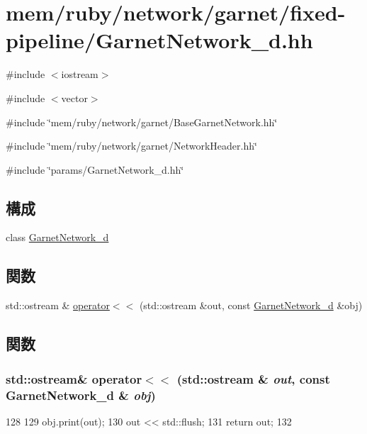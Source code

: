 \hypertarget{GarnetNetwork__d_8hh}{
\section{mem/ruby/network/garnet/fixed-\/pipeline/GarnetNetwork\_\-d.hh}
\label{GarnetNetwork__d_8hh}
}
{\ttfamily \#include $<$iostream$>$}\par
{\ttfamily \#include $<$vector$>$}\par
{\ttfamily \#include \char`\"{}mem/ruby/network/garnet/BaseGarnetNetwork.hh\char`\"{}}\par
{\ttfamily \#include \char`\"{}mem/ruby/network/garnet/NetworkHeader.hh\char`\"{}}\par
{\ttfamily \#include \char`\"{}params/GarnetNetwork\_\-d.hh\char`\"{}}\par
\subsection*{構成}
\begin{DoxyCompactItemize}
\item 
class \hyperlink{classGarnetNetwork__d}{GarnetNetwork\_\-d}
\end{DoxyCompactItemize}
\subsection*{関数}
\begin{DoxyCompactItemize}
\item 
std::ostream \& \hyperlink{GarnetNetwork__d_8hh_a7299b04eaa01d0574e74abdcb91ad4b4}{operator$<$$<$} (std::ostream \&out, const \hyperlink{classGarnetNetwork__d}{GarnetNetwork\_\-d} \&obj)
\end{DoxyCompactItemize}


\subsection{関数}
\hypertarget{GarnetNetwork__d_8hh_a7299b04eaa01d0574e74abdcb91ad4b4}{
\subsubsection[{operator$<$$<$}]{\setlength{\rightskip}{0pt plus 5cm}std::ostream\& operator$<$$<$ (std::ostream \& {\em out}, \/  const {\bf GarnetNetwork\_\-d} \& {\em obj})}}
\label{GarnetNetwork__d_8hh_a7299b04eaa01d0574e74abdcb91ad4b4}



\begin{DoxyCode}
128 {
129     obj.print(out);
130     out << std::flush;
131     return out;
132 }
\end{DoxyCode}
